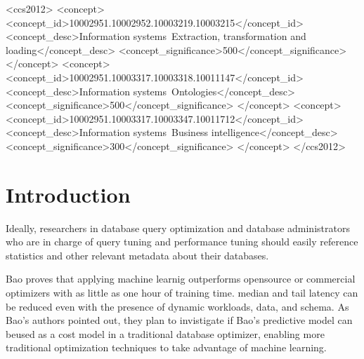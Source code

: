 \documentclass[sigconf]{acmart}
\begin{document}
\begin{CCSXML}
	<ccs2012>
	<concept>
	<concept_id>10002951.10002952.10003219.10003215</concept_id>
	<concept_desc>Information systems~Extraction, transformation and loading</concept_desc>
	<concept_significance>500</concept_significance>
	</concept>
	<concept>
	<concept_id>10002951.10003317.10003318.10011147</concept_id>
	<concept_desc>Information systems~Ontologies</concept_desc>
	<concept_significance>500</concept_significance>
	</concept>
	<concept>
	<concept_id>10002951.10003317.10003347.10011712</concept_id>
	<concept_desc>Information systems~Business intelligence</concept_desc>
	<concept_significance>300</concept_significance>
	</concept>
	</ccs2012>
\end{CCSXML}



\maketitle

\section{Introduction}
Ideally, researchers in database query optimization and database administrators who are in charge of query tuning and performance tuning should easily reference statistics and other relevant metadata about their databases. 

Bao proves that applying machine learnig outperforms opensource or commercial optimizers with as little as one hour of training time. median and tail latency can be reduced even with the presence of dynamic workloads, data, and schema. As Bao's authors pointed out, they plan to invistigate if Bao's predictive model can beused as a cost model in a traditional database optimizer, enabling more traditional optimization techniques to take advantage of machine learning.
\end{document}
